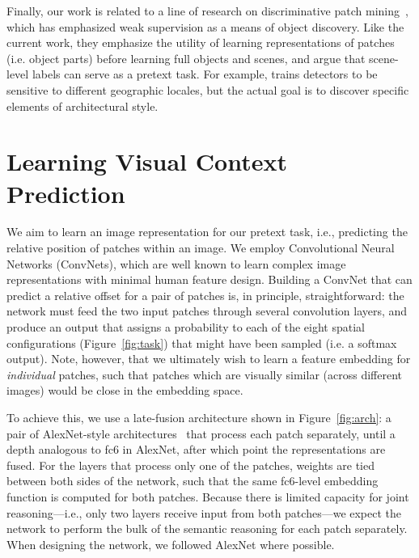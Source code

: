 \documentclass[10pt,twocolumn,letterpaper]{article}
\begin{document}
Finally, our work is related to a line of research on discriminative patch
mining~\cite{doersch2012makes,singh2012unsupervised,juneja13blocks,li2013harvesting,sun2013learning,doersch2013mid}, which has emphasized weak supervision as a means of object discovery.  Like the current work, they emphasize the utility of learning representations of patches (i.e. object parts) before learning full objects and scenes, and argue that scene-level labels can serve as a pretext task.  %
For example, \cite{doersch2012makes} trains detectors to be sensitive to different geographic locales, but the actual goal %
is to discover specific elements of architectural style.








\vspace{-0.05in}
\section{Learning Visual Context Prediction}\label{sec:learning}
\vspace{-0.05in}
We aim to learn an image representation for our pretext task, i.e., predicting the relative position of patches within an image.  We employ Convolutional Neural Networks (ConvNets), which are well known to learn complex image representations with minimal human feature design.
Building a ConvNet that can predict a relative offset for a pair of patches is, in principle, straightforward: the network must feed the two input patches through several convolution layers, and produce an output that assigns a probability to each of the eight spatial configurations (Figure~\ref{fig:task}) that might have been sampled (i.e. a softmax output).  Note, however, that we ultimately wish to learn a feature embedding for {\em individual} patches, such that patches which are visually similar (across different images) would be close in the 
embedding space.  


To achieve this, we use a late-fusion architecture shown in Figure~\ref{fig:arch}: a pair of AlexNet-style architectures~\cite{krizhevsky2012imagenet} that process each patch separately, until a depth analogous to fc6 in AlexNet, after which point the representations are fused.  For the layers that process only one of the patches, weights are tied between both sides of the network, such that the same fc6-level embedding function is computed for both patches.  
Because there is limited capacity for joint reasoning---i.e., only two layers receive input from both patches---we expect the network to perform the bulk of the semantic reasoning for each patch separately.
When designing the network, we followed AlexNet where possible.  
\end{document}

